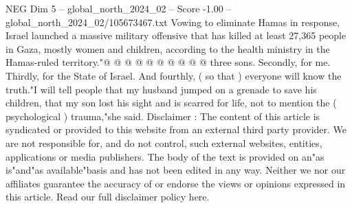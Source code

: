 \begin{textsample}{NEG Dim 5 – global\_north\_2024\_02 – Score -1.00 – global\_north\_2024\_02/105673467.txt}
Vowing to eliminate Hamas in response, Israel launched a massive military offensive that has killed at least 27,365 people in Gaza, mostly women and children, according to the health ministry in the Hamas-ruled territory."@ @ @ @ @ @ @ @ @ @ three sons.
Secondly, for me.
Thirdly, for the State of Israel.
And fourthly, ( so that ) everyone will know the truth."I will tell people that my husband jumped on a grenade to save his children, that my son lost his sight and is scarred for life, not to mention the ( psychological ) trauma,"she said.
Disclaimer : The content of this article is syndicated or provided to this website from an external third party provider.
We are not responsible for, and do not control, such external websites, entities, applications or media publishers.
The body of the text is provided on an"as is"and"as available"basis and has not been edited in any way.
Neither we nor our affiliates guarantee the accuracy of or endorse the views or opinions expressed in this article.
Read our full disclaimer policy here.

\end{textsample}
